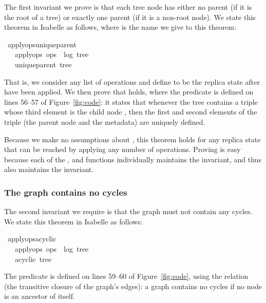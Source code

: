 \documentclass[sigconf]{acmart}
\renewenvironment{isabelle}{%
  \medbreak\noindent%
  \renewcommand{\isanewline}{\\}%
  \begin{minipage}{\columnwidth}%
  \begin{isabellebody}%
  \begin{tabbing}%
}{%
  \end{tabbing}%
  \end{isabellebody}%
  \end{minipage}%
  \medbreak%
}
\renewcommand{\isacartoucheopen}{}
\renewcommand{\isacartoucheclose}{}
\begin{document}
The first invariant we prove is that each tree node has either no parent (if it is the root of a tree) or exactly one parent (if it is a non-root node).
We state this theorem in Isabelle as follows, where  is the name we give to this theorem:
\begin{isabelle}
\isamarkupfalse%
\ apply{\isacharunderscore}ops{\isacharunderscore}unique{\isacharunderscore}parent{\isacharcolon}\isanewline
\ \ \ {\isacartoucheopen}apply{\isacharunderscore}ops\ ops\ {\isacharequal}\ {\isacharparenleft}log{\isacharcomma}\ tree{\isacharparenright}{\isacartoucheclose}\isanewline
\ \ \ {\isacartoucheopen}unique{\isacharunderscore}parent\ tree{\isacartoucheclose}
\end{isabelle}
\noindent That is, we consider any list of operations  and define  to be the replica state after  have been applied.
We then prove that  holds, where the  predicate is defined on lines 56--57 of Figure~\ref{fig:code}: it states that whenever the tree contains a triple whose third element is the child node , then the first and second elements of the triple (the parent node and the metadata) are uniquely defined.

Because we make no assumptions about , this theorem holds for any replica state that can be reached by applying any number of operations.
Proving  is easy because each of the ,  and  functions individually maintains the  invariant, and thus  also maintains the invariant.

\subsubsection{The graph contains no cycles}

The second invariant we require is that the graph must not contain any cycles.
We state this theorem in Isabelle as follows:
\begin{isabelle}
\isamarkupfalse%
\ apply{\isacharunderscore}ops{\isacharunderscore}acyclic{\isacharcolon}\isanewline
\ \ \ {\isacartoucheopen}apply{\isacharunderscore}ops\ ops\ {\isacharequal}\ {\isacharparenleft}log{\isacharcomma}\ tree{\isacharparenright}{\isacartoucheclose}\isanewline
\ \ \ {\isacartoucheopen}acyclic\ tree{\isacartoucheclose}
\end{isabelle}
\noindent The  predicate is defined on lines 59--60 of Figure~\ref{fig:code}, using the  relation (the transitive closure of the graph's edges): a graph contains no cycles if no node is an ancestor of itself.
\end{document}
